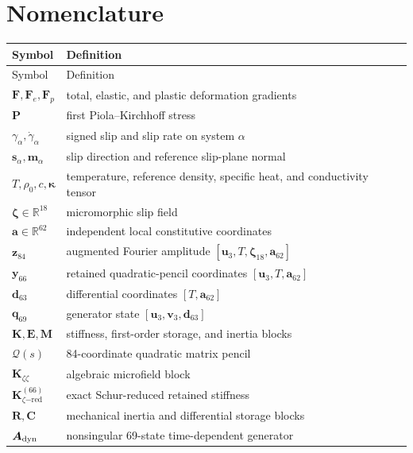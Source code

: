 \section*{Nomenclature}
\begin{longtable}{@{}p{}p{}@{}}
\toprule
Symbol & Definition \\
\midrule
\endfirsthead
\toprule
Symbol & Definition \\
\midrule
\endhead
$\boldsymbol F,\boldsymbol F_e,\boldsymbol F_p$ & total, elastic, and plastic deformation gradients \\
$\boldsymbol P$ & first Piola--Kirchhoff stress \\
$\gamma_\alpha,\dot\gamma_\alpha$ & signed slip and slip rate on system $\alpha$ \\
$\boldsymbol s_\alpha,\boldsymbol m_\alpha$ & slip direction and reference slip-plane normal \\
$T,\rho_0,c,\boldsymbol\kappa$ & temperature, reference density, specific heat, and conductivity tensor \\
$\boldsymbol\zeta\in\mathbb R^{18}$ & micromorphic slip field \\
$\boldsymbol a\in\mathbb R^{62}$ & independent local constitutive coordinates \\
$\boldsymbol z_{84}$ & augmented Fourier amplitude $[\boldsymbol u_3,T,\boldsymbol\zeta_{18},\boldsymbol a_{62}]$ \\
$\boldsymbol y_{66}$ & retained quadratic-pencil coordinates $[\boldsymbol u_3,T,\boldsymbol a_{62}]$ \\
$\boldsymbol d_{63}$ & differential coordinates $[T,\boldsymbol a_{62}]$ \\
$\boldsymbol q_{69}$ & generator state $[\boldsymbol u_3,\boldsymbol v_3,\boldsymbol d_{63}]$ \\
$\boldsymbol K,\boldsymbol E,\boldsymbol M$ & stiffness, first-order storage, and inertia blocks \\
$\boldsymbol{\mathcal Q}(s)$ & 84-coordinate quadratic matrix pencil \\
$\boldsymbol K_{\zeta\zeta}$ & algebraic microfield block \\
$\boldsymbol K_{\zeta\mathrm{-red}}^{(66)}$ & exact Schur-reduced retained stiffness \\
$\boldsymbol R,\boldsymbol C$ & mechanical inertia and differential storage blocks \\
$\boldsymbol A_{\rm dyn}$ & nonsingular 69-state time-dependent generator \\

\end{longtable}

